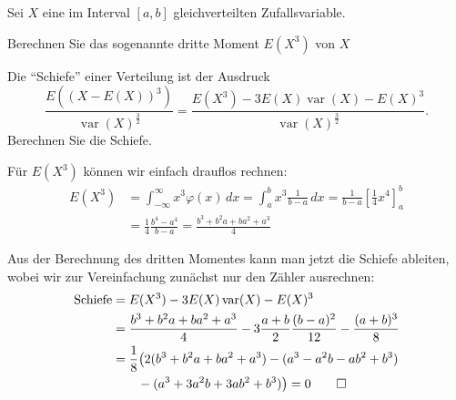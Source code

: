 Sei $X$ eine im Interval $[a,b]$ gleichverteilten Zufallsvariable.
\begin{teilaufgaben}
\item Berechnen Sie das sogenannte dritte Moment $E(X^3)$ von $X$
\item Die ``Schiefe'' einer Verteilung ist der Ausdruck
\[
\frac{E((X-E(X))^3)}{\operatorname{var}(X)^{\frac32}}
=
\frac{E(X^3)-3E(X)\operatorname{var}(X)-E(X)^3}{\operatorname{var}(X)^{\frac32}}.
\]
Berechnen Sie die Schiefe.
\end{teilaufgaben}

\begin{loesung}
\begin{teilaufgaben}
\item
Für $E(X^3)$ können wir einfach drauflos rechnen:
\begin{align*}
E(X^3)
&=
\int_{-\infty}^\infty x^3\varphi(x)\,dx
=
\int_a^bx^3\frac1{b-a}\,dx
=
\frac1{b-a}\left[\frac14x^4\right]_a^b
\\
&=
\frac14\frac{b^4-a^4}{b-a}
=
\frac{b^3+b^2a+ba^2+a^3}{4}
\end{align*}
\item Aus der Berechnung des dritten Momentes kann man jetzt
die Schiefe ableiten, wobei wir zur Vereinfachung zunächst
nur den Zähler ausrechnen:
\begin{align*}
\text{Schiefe}
&=
E(X^3)-3E(X)\operatorname{var}(X)-E(X)^3
\\
&=
\frac{b^3+b^2a+ba^2+a^3}{4}
-3\frac{a+b}2\frac{(b-a)^2}{12}
-\frac{(a+b)^3}{8}
\\
&=
\frac18\bigl(
2(b^3+b^2a+ba^2+a^3)
-(a^3-a^2b-ab^2+b^3)
\\
&\qquad
-(a^3+3a^2b+3ab^2+b^3)
\bigr)
=0
\qedhere
\end{align*}
\end{teilaufgaben}
\end{loesung}


